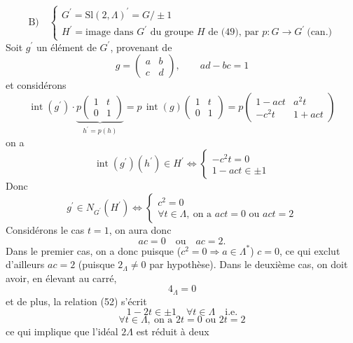 \documentclass[11pt,a4paper]{article}
\begin{document}
\[
\tag{51}
\text{B)}\quad
\begin{cases}
G^{\prime} = \mathrm{Sl}(2,\Lambda)^{\prime} = G/\pm1\\
H^{\prime} = \text{image dans } G^{\prime} \text{ du groupe } H \text{ de (49), par } p\colon G\to G^{\prime}\ \text{(can.)}
\end{cases}
\]
Soit $g^{\prime}$ un élément de $G^{\prime}$, provenant de
\[
g = \begin{pmatrix} a & b\\ c & d\end{pmatrix}, \qquad ad-bc=1
\]
et considérons  \struck{\ill{}}
\[
\operatorname{int}(g^{\prime})\cdot \underbrace{p\begin{pmatrix} 1 & t\\ 0 & 1\end{pmatrix}}_{h^{\prime}=p(h)}
= p\,\operatorname{int}(g)\begin{pmatrix} 1 & t\\ 0 & 1\end{pmatrix}
= p\begin{pmatrix} 1-act & a^2 t\\ -c^2 t & 1+act\end{pmatrix}
\]
on a
\[
\tag{52}
\operatorname{int}(g^{\prime})(h^{\prime})\in H^{\prime} \iff
\begin{cases} -c^2 t = 0\\ 1-act\in\pm1 \end{cases}
\]
Donc
\[
g^{\prime}\in N_{G^{\prime}}(H^{\prime}) \iff
\begin{cases} c^2 = 0\\ \forall t\in\Lambda,\ \text{on a } act=0 \text{ ou } act=2 \end{cases}
\]
Considérons le cas $t=1$, on aura donc
\[
ac = 0 \quad\text{ou}\quad ac = 2.
\]
Dans le premier cas, on a donc puisque ($c^2=0\Rightarrow a\in\Lambda^{*}$) $c=0$,
ce qui exclut d'ailleurs $ac=2$ (puisque $2_\Lambda\neq0$ par hypothèse). Dans le deuxième cas,
on doit avoir, en élevant au carré,
\[
4_\Lambda = 0
\]
et de plus, la  relation (52) \struck{\ill{}} s'écrit
\[
1-2t\in\pm1 \quad \forall t\in\Lambda \quad\text{i.e.}
\]
\[
\tag{53}
\forall t\in\Lambda,\ \text{on a } 2t=0 \text{ ou } 2t=2
\]
ce qui implique que l'idéal $2\Lambda$ est réduit à deux
\end{document}
